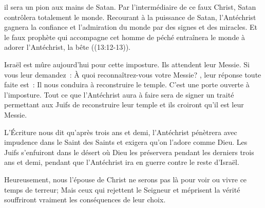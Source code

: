 

 
 il sera un pion aux mains de Satan. Par l'intermédiaire de ce faux Christ,
 Satan contrôlera totalement le monde. Recourant à la puissance de Satan,
 l'Antéchrist gagnera la confiance et l'admiration du monde
 par des signes et des miracles.
 Et le faux prophète qui accompagne cet homme de péché entraînera le monde
 à adorer l'Antéchrist, la \og bête \fg{} ((13:12-13)). 



Israël est mûre aujourd'hui pour cette imposture. Ils attendent leur Messie.
 Si vous leur demandez~: 
 \og À quoi reconnaîtrez-vous votre Messie? \fg{},
 leur réponse toute faite est~: 
 \og Il nous conduira à reconstruire le temple. \fg{}
 C'est une porte ouverte à l'imposture. Tout ce que l'Antéchrist
 aura à faire sera de signer un traité permettant aux Juifs
 de reconstruire leur temple \ocadr et ils croiront qu'il est leur Messie. 

L'Écriture nous dit qu'après trois ans et demi,
 l'Antéchrist pénètrera avec impudence dans le Saint des Saints
 et exigera qu'on l'adore comme Dieu. Les Juifs s'enfuiront dans le désert
 où Dieu les préservera pendant les derniers trois ans et demi,
 pendant que l'Antéchrist ira en guerre contre le reste d'Israël. 

Heureusement, nous \ocadr l'épouse de Christ \fcadr{} ne serons pas là
 pour voir ou vivre ce temps de terreur; Mais ceux qui rejettent le Seigneur
 et méprisent 
 la vérité souffriront vraiment les conséquences 
 de leur choix. 

\dvrule


